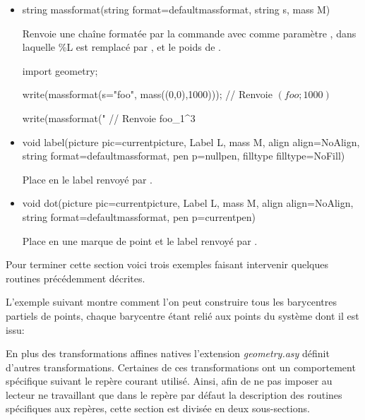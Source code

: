 \documentclass[pdftex]{article}
\newcommand{\geo}{l'extension \emph{geometry.asy}\xspace}
\begin{document}
\begin{itemize}
  \vspace*{2mm}
\item {}
    \begin{Vcolor}
    string massformat(string format=defaultmassformat,
    string s, mass M)
  \end{Vcolor}
  Renvoie une chaîne formatée par la commande  avec comme
  paramètre , dans laquelle \%L est remplacé par , et le poids de .
    \begin{Vcolor}
    import geometry;

    write(massformat(s="foo", mass((0,0),1000)));
    // Renvoie $\left(foo;1000\right)$


    write(massformat("%
    // Renvoie foo\_1\!\times{}^{3\phantom{+}}

  \end{Vcolor}
  \vspace*{2mm}
\item {}
    \begin{Vcolor}
    void label(picture pic=currentpicture, Label L, mass M,
    align align=NoAlign, string format=defaultmassformat,
    pen p=nullpen, filltype filltype=NoFill)
  \end{Vcolor}
  Place en  le label renvoyé par .
\item {}
    \begin{Vcolor}
    void dot(picture pic=currentpicture, Label L, mass M, align align=NoAlign,
    string format=defaultmassformat, pen p=currentpen)
  \end{Vcolor}
  Place en  une marque de point et le label renvoyé par .
\end{itemize}
Pour terminer cette section voici trois exemples faisant intervenir
quelques routines précédemment décrites.


L'exemple suivant montre comment l'on peut construire tous les barycentres partiels de  points,
chaque barycentre étant relié aux points du système dont il est issu:

En plus des transformations affines natives \geo définit d'autres
transformations. Certaines de ces transformations ont un comportement spécifique suivant le
repère courant utilisé. Ainsi, afin de ne pas imposer au lecteur
ne travaillant que dans le repère par défaut la description des
routines spécifiques aux repères, cette section est divisée en deux sous-sections.
\end{document}
